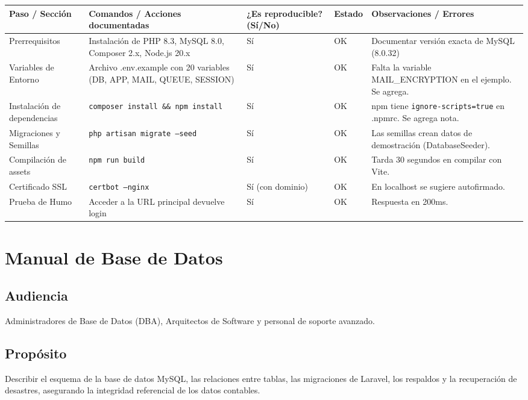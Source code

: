 \documentclass[stu]{apa7}
\begin{document}
\begin{longtable}{|L{3.5cm}|C{2.5cm}|C{2cm}|C{2.5cm}|L{3cm}|}
\hline
{}
\textbf{Paso / Sección} & \textbf{Comandos / Acciones documentadas} & \textbf{¿Es reproducible? (Sí/No)} & \textbf{Estado} & \textbf{Observaciones / Errores} \\
\hline
Prerrequisitos & Instalación de PHP 8.3, MySQL 8.0, Composer 2.x, Node.js 20.x & Sí & OK & Documentar versión exacta de MySQL (8.0.32) \\
\hline
Variables de Entorno & Archivo .env.example con 20 variables (DB, APP, MAIL, QUEUE, SESSION) & Sí & OK & Falta la variable MAIL\_ENCRYPTION en el ejemplo. Se agrega. \\
\hline
Instalación de dependencias & \texttt{composer install \&\& npm install} & Sí & OK & npm tiene \texttt{ignore-scripts=true} en .npmrc. Se agrega nota. \\
\hline
Migraciones y Semillas & \texttt{php artisan migrate --seed} & Sí & OK & Las semillas crean datos de demostración (DatabaseSeeder). \\
\hline
Compilación de assets & \texttt{npm run build} & Sí & OK & Tarda 30 segundos en compilar con Vite. \\
\hline
Certificado SSL & \texttt{certbot --nginx} & Sí (con dominio) & OK & En localhost se sugiere autofirmado. \\
\hline
Prueba de Humo & Acceder a la URL principal devuelve login & Sí & OK & Respuesta en 200ms. \\
\hline
\end{longtable}

\newpage

\section{Manual de Base de Datos}

\subsection{Audiencia}

Administradores de Base de Datos (DBA), Arquitectos de Software y personal de soporte avanzado.

\subsection{Propósito}

Describir el esquema de la base de datos MySQL, las relaciones entre tablas, las migraciones de Laravel, los respaldos y la recuperación de desastres, asegurando la integridad referencial de los datos contables.
\end{document}
